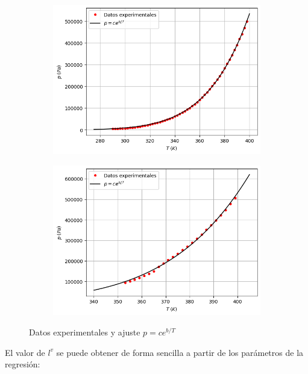 \documentclass[a4paper,12pt,titlepage]{article}
\begin{document}
\begin{figure}[h!]
    \centering
    \begin{subfigure}{0.49\textwidth}
        \centering
        \includegraphics[width=1.02\linewidth]{ELV simple/curva_c_oh.png}
    \end{subfigure}
    \begin{subfigure}{0.49\textwidth}
        \centering
        \includegraphics[width=1.02\linewidth]{ELV simple/curva_e_oh.png}
    \end{subfigure}
    \caption{Datos experimentales y ajuste $p=ce^{b/T}$}
    \label{fig:enter-label}
\end{figure}

El valor de $l^v$ se puede obtener de forma sencilla a partir de los parámetros de la regresión:
\end{document}
